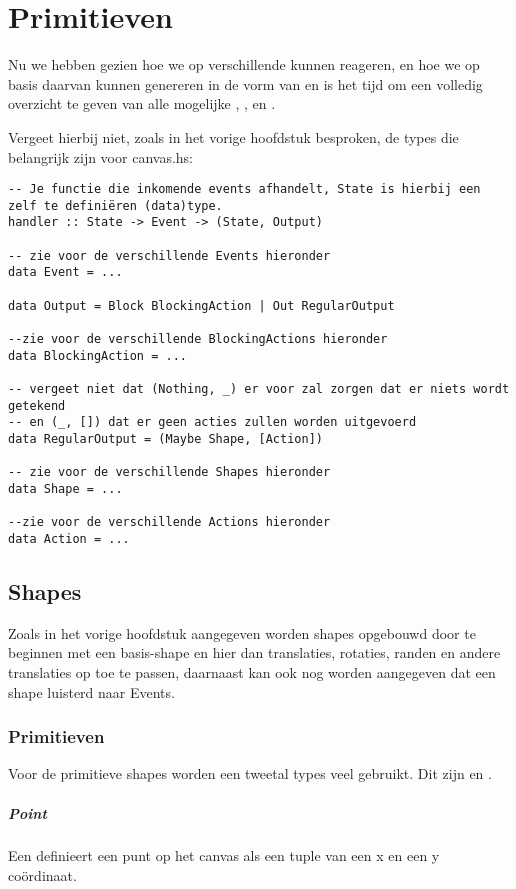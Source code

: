 \section{Primitieven}
Nu we hebben gezien hoe we op verschillende \events kunnen reageren, en hoe we op basis daarvan  kunnen genereren in de vorm van \shapes en \actions is het tijd om een volledig overzicht te geven van alle mogelijke \events , \shapes , en \actions.

Vergeet hierbij niet, zoals in het vorige hoofdstuk besproken, de types die belangrijk zijn voor canvas.hs:

\begin{lstlisting}
-- Je functie die inkomende events afhandelt, State is hierbij een zelf te definiëren (data)type.
handler :: State -> Event -> (State, Output)

-- zie voor de verschillende Events hieronder
data Event = ...

data Output = Block BlockingAction | Out RegularOutput

--zie voor de verschillende BlockingActions hieronder
data BlockingAction = ... 

-- vergeet niet dat (Nothing, _) er voor zal zorgen dat er niets wordt getekend 
-- en (_, []) dat er geen acties zullen worden uitgevoerd
data RegularOutput = (Maybe Shape, [Action])

-- zie voor de verschillende Shapes hieronder
data Shape = ...

--zie voor de verschillende Actions hieronder
data Action = ...
\end{lstlisting}

\subsection{Shapes}
Zoals in het vorige hoofdstuk aangegeven worden shapes opgebouwd door te beginnen met een basis-shape en hier dan translaties, rotaties, randen en andere translaties op toe te passen, daarnaast kan ook nog worden aangegeven dat een shape luisterd naar Events.

\subsubsection{Primitieven}
Voor de primitieve shapes worden een tweetal types veel gebruikt. Dit zijn  en . 

\subparagraph{Point}
Een  definieert een punt op het canvas als een tuple van een x en een y coördinaat. 

